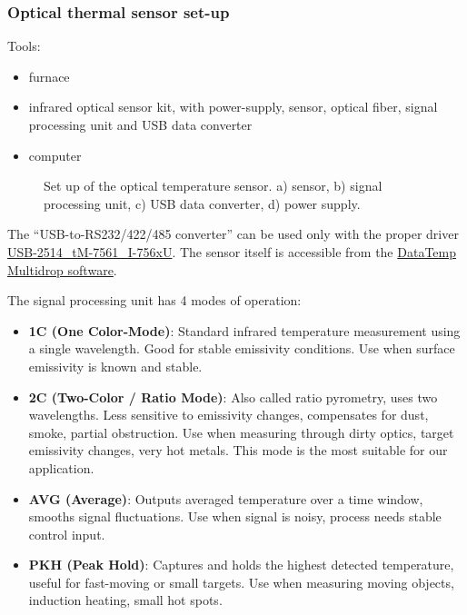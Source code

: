 \documentclass[../../main.tex]{subfiles}
\begin{document}
\subsubsection{Optical thermal sensor set-up}

Tools:
\begin{itemize}
    \item furnace
    \item infrared optical sensor kit, with power-supply, sensor, optical fiber, signal processing unit and USB data converter
    \item computer
\end{itemize}

\vspace{0mm}
\begin{figure}[H]
    \centering
        
        \caption[Set up of the optical temperature sensor.]{Set up of the optical temperature sensor. a) sensor, b) signal processing unit, c) USB data converter, d) power supply.}
        \label{temperature_sensor_set-up}
\end{figure}
\vspace{0mm}

The ``USB-to-RS232/422/485 converter'' can be used only with the proper driver \href{https://www.icpdas.com/en/download/show.php?num=3079&model=tM-7561}{USB-2514\_tM-7561\_I-756xU}. The sensor itself is accessible from the \href{https://www.flukeprocessinstruments.com/en-us/download/datatemp-multidrop-v6199}{DataTemp Multidrop software}.


The signal processing unit has 4 modes of operation:

\begin{itemize}
    \item \textbf{1C (One Color-Mode)}: Standard infrared temperature measurement using a single wavelength. Good for stable emissivity conditions. Use when surface emissivity is known and stable.
    \item \textbf{2C (Two-Color / Ratio Mode)}: Also called ratio pyrometry, uses two wavelengths. Less sensitive to emissivity changes, compensates for dust, smoke, partial obstruction. Use when measuring through dirty optics, target emissivity changes, very hot metals. This mode is the most suitable for our application.
    \item \textbf{AVG (Average)}: Outputs averaged temperature over a time window, smooths signal fluctuations. Use when signal is noisy, process needs stable control input.
    \item \textbf{PKH (Peak Hold)}: Captures and holds the highest detected temperature, useful for fast-moving or small targets. Use when measuring moving objects, induction heating, small hot spots.
\end{itemize}
\end{document}
